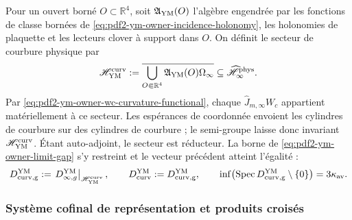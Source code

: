 Pour un ouvert borné $O\subset\mathbb R^4$, soit
$\mathfrak A_{\rm YM}(O)$ l’algèbre engendrée par les fonctions de classe bornées de
\eqref{eq:pdf2-ym-owner-incidence-holonomy}, les holonomies de plaquette et les lecteurs
clover à support dans $O$. On définit le secteur de courbure physique par
\begin{equation}\label{eq:pdf2-ym-owner-curvature-cyclic-sector}
 \mathscr H_{\rm YM}^{\rm curv}
 :=\overline{\bigcup_{O\Subset\mathbb R^4}
   \mathfrak A_{\rm YM}(O)\Omega_\infty}
 \subseteq\widehat{\mathscr H}_\infty^{\rm phys}.
\end{equation}
Par \eqref{eq:pdf2-ym-owner-wc-curvature-functional}, chaque
$\widehat J_{m,\infty}W_c$ appartient matériellement à ce secteur.
Les espérances de coordonnée envoient les cylindres de courbure sur des cylindres de
courbure ; le semi-groupe laisse donc invariant
$\mathscr H_{\rm YM}^{\rm curv}$. Étant auto-adjoint, le secteur est réducteur. La
borne de \eqref{eq:pdf2-ym-owner-limit-gap} s’y restreint et le vecteur précédent
atteint l’égalité :
\begin{equation}\label{eq:pdf2-ym-owner-curvature-sector-gap}
 D_{\rm curv,g}^{\rm YM}
 :=\left.D_{\infty,g}^{\rm YM}\right|_{\mathscr H_{\rm YM}^{\rm curv}},
 \qquad D_{\rm curv}^{\rm YM}:=D_{\rm curv,g}^{\rm YM},
 \qquad
 \inf\bigl(\operatorname{Spec}D_{\rm curv,g}^{\rm YM}\setminus\{0\}\bigr)
 =3\kappa_{\rm av}.
\end{equation}

\subsubsection{Système cofinal de représentation et produits croisés}

